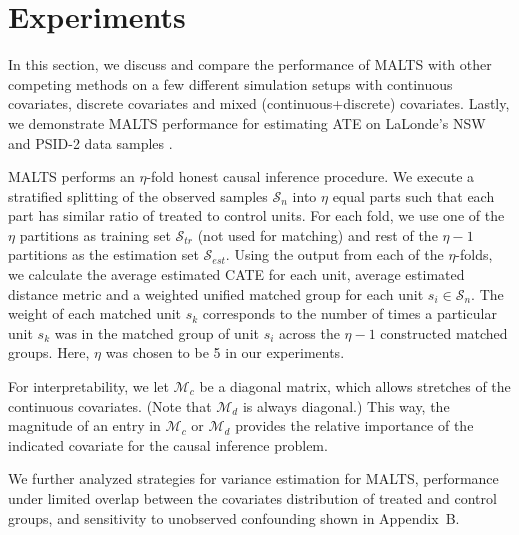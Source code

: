 \section{Experiments}
\label{sec:Experiments}
In this section, we discuss and compare the performance of MALTS with other competing methods on a few different simulation setups with continuous covariates, discrete covariates and mixed (continuous+discrete) covariates. Lastly, we demonstrate MALTS performance for estimating ATE on LaLonde's NSW and PSID-2 data samples \citep{lalonde}. 

MALTS performs an $\eta$-fold honest causal inference procedure. We execute a stratified splitting of the observed samples $\mathcal{S}_n$ into $\eta$ equal parts such that each part has similar ratio of treated to control units. For each fold, we use one of the $\eta$ partitions as training set $\mathcal{S}_{tr}$ (not used for matching) and rest of the $\eta-1$ partitions as the estimation set $\mathcal{S}_{est}$. 
Using the output from each of the $\eta$-folds, we calculate the average estimated CATE for each unit, average estimated distance metric and a weighted unified matched group for each unit $s_i \in \mathcal{S}_n$. The weight of each matched unit $s_k$ corresponds to the number of times a particular unit $s_k$ was in the matched group of unit $s_i$ across the $\eta-1$ constructed matched groups. Here, $\eta$ was chosen to be 5 in our experiments. 

For interpretability, we let $\mathcal{M}_c$ be a diagonal matrix, which allows stretches of the continuous covariates. (Note that $\mathcal{M}_d$ is always diagonal.) This way, the magnitude of an entry in $\mathcal{M}_c$ or $\mathcal{M}_d$ provides the relative importance of the indicated covariate for the causal inference problem.

We further analyzed strategies for variance estimation for MALTS, performance under limited overlap between the covariates distribution of treated and control groups, and sensitivity to unobserved confounding shown in Appendix~B. 


